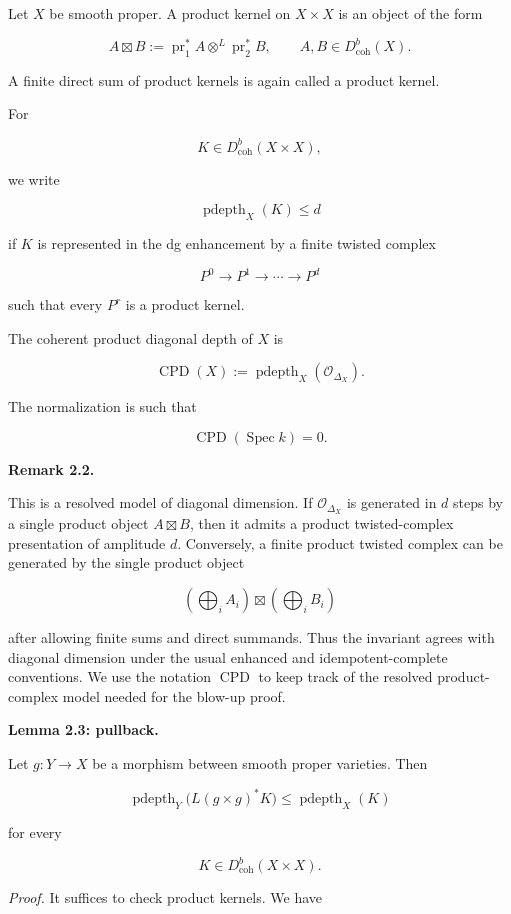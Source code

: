 \documentclass[11pt]{amsart}
\theoremstyle{definition}
\begin{document}
Let $X$ be smooth proper. A product kernel on $X\times X$ is an object of the form

\[
A\boxtimes B
:=
\operatorname{pr}_1^*A\otimes^L\operatorname{pr}_2^*B,
\qquad
A,B\in D^b_{\mathrm{coh}}(X).
\]

A finite direct sum of product kernels is again called a product kernel.

For

\[
K\in D^b_{\mathrm{coh}}(X\times X),
\]

we write

\[
\operatorname{pdepth}_X(K)\le d
\]

if $K$ is represented in the dg enhancement by a finite twisted complex

\[
P^0\to P^1\to\cdots\to P^d
\]

such that every $P^r$ is a product kernel.

The coherent product diagonal depth of $X$ is

\[
\operatorname{CPD}(X):=\operatorname{pdepth}_X(\mathcal O_{\Delta_X}).
\]

The normalization is such that

\[
\operatorname{CPD}(\operatorname{Spec}k)=0.
\]

\noindent\textbf{Remark 2.2.}

This is a resolved model of diagonal dimension. If $\mathcal O_{\Delta_X}$ is generated in $d$ steps by a single product object $A\boxtimes B$, then it admits a product twisted-complex presentation of amplitude $d$. Conversely, a finite product twisted complex can be generated by the single product object

\[
\left(\bigoplus_i A_i\right)
\boxtimes
\left(\bigoplus_i B_i\right)
\]

after allowing finite sums and direct summands. Thus the invariant agrees with diagonal dimension under the usual enhanced and idempotent-complete conventions. We use the notation $\operatorname{CPD}$ to keep track of the resolved product-complex model needed for the blow-up proof.

\noindent\textbf{Lemma 2.3: pullback.}

Let $g:Y\to X$ be a morphism between smooth proper varieties. Then

\[
\operatorname{pdepth}_Y\bigl(L(g\times g)^*K\bigr)
\le
\operatorname{pdepth}_X(K)
\]

for every

\[
K\in D^b_{\mathrm{coh}}(X\times X).
\]

\noindent\emph{Proof.} It suffices to check product kernels. We have
\end{document}

